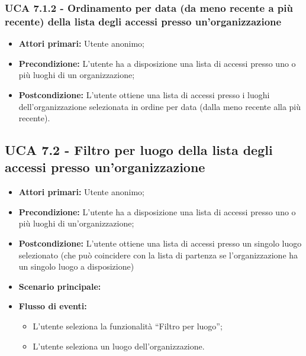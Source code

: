 \subsubsection{UCA 7.1.2 - Ordinamento per data (da meno recente a più recente) della lista degli accessi presso un’organizzazione}%
\begin{itemize}
	\item \textbf{Attori primari:} Utente anonimo;
	\item \textbf{Precondizione:} L’utente ha a disposizione una lista di accessi presso uno o più luoghi di un organizzazione;	
	\item \textbf{Postcondizione:} L’utente ottiene una lista di accessi presso i luoghi dell’organizzazione selezionata in ordine per data (dalla meno recente alla più recente).	
\end{itemize}

\subsection{UCA 7.2 - Filtro per luogo della lista degli accessi presso un’organizzazione}%
\begin{itemize}
	\item \textbf{Attori primari:} Utente anonimo;
	\item \textbf{Precondizione:} L’utente ha a disposizione una lista di accessi presso uno o più luoghi di un'organizzazione;
	\item \textbf{Postcondizione:} L’utente ottiene una lista di accessi presso un singolo luogo selezionato (che può coincidere con la lista di partenza se l’organizzazione ha un singolo luogo a disposizione)	
	\item \textbf{Scenario principale:}
	\item \textbf{Flusso di eventi:} 
	\begin{itemize}
		\item L’utente seleziona la funzionalità “Filtro per luogo”;
		\item L’utente seleziona un luogo dell’organizzazione.
	\end{itemize}
\end{itemize}